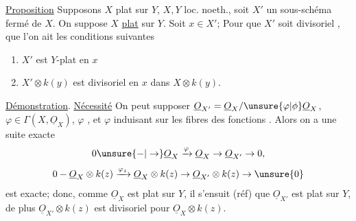 \uline{Proposition} Supposons $X$ plat sur $Y$, $X,Y$ loc. noeth., soit $X'$ un sous-schéma fermé de $X$. On suppose $X$ \uline{plat} sur $Y$. Soit $x\in X'$;  Pour que $X'$ soit divisoriel  ,  que l'on ait les conditions suivantes

\begin{enumerate}[label=(\roman*)]
\item $X'$ est $Y$-plat en $x$
\item $X'\otimes k(y)$ est divisoriel  en $x$ dans $X\otimes k(y)$.
\end{enumerate}

\uline{Démonstration}. \uline{Nécessité} On peut supposer $\underline{O}_{X'}=\underline{O}_X/\unsure{\varphi|\phi}\underline{O}_X$, $\varphi\in\Gamma(X,\underline{O}_X)$, $\varphi$    \uline{}, et $\varphi$ induisant sur les fibres des fonctions . Alors on a une suite exacte
\[
0\unsure{-|\to}\underline{O}_X\xrightarrow{\varphi}\underline{O}_X\to\underline{O}_{X'}\to0,
\]
  
\[
0-\underline{O}_X\otimes k(z)\xrightarrow{\varphi_z}\underline{O}_X\otimes k(z)\to\underline{O}_{X'}\otimes k(z)\to\unsure{0}
\]
est exacte; donc, comme $\underline{O}_X$ est plat sur $Y$, il s'ensuit (réf) que $\underline{O}_{X'}$ est plat sur $Y$, de plus $\underline{O}_{X'}\otimes k(z)$ est  divisoriel pour $\underline{O}_X\otimes k(z)$. 

